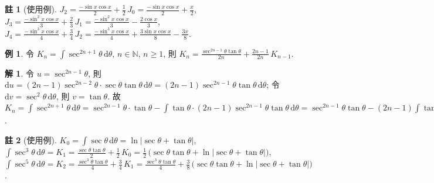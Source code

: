\documentclass[12pt]{extarticle}
\newcommand{\ds}{\displaystyle}
\newcommand{\ie}{\;\Longrightarrow\;}
\theoremstyle{definition}
\newtheorem*{ex}{例}
\newtheorem*{sol}{解}
\newtheorem*{rmk}{註}
\newcommand{\myline}{\noindent\makebox[\linewidth]{\rule{\paperwidth}{0.4pt}}}
\begin{document}
\begin{rmk}[使用例]
  $\ds J_2 = \frac{-\sin x\cos x}{2} + \frac{1}{2}\,J_0 = \frac{-\sin x\cos x}{2} + \frac{x}{2}$, $\ds J_3 = \frac{-\sin^2\!x\cos x}{3} + \frac{2}{3}\,J_1 = \frac{-\sin^2\!x\cos x}{3} - \frac{2\cos x}{3}$, $\ds J_4 = \frac{-\sin^3\!x\cos x}{4} + \frac{3}{4}\,J_2 = \frac{-\sin^3\!x\cos x}{4} + \frac{3\sin x\cos x}{8} - \frac{3x}{8}$.
\end{rmk}

\begin{ex} 
  令 $\ds K_n = \int\!\sec^{2n+1}\!\theta\,\text{d}\theta$, $n\in\mathbb{N}$, $n\geqslant 1$, 則 $\ds K_n = \frac{\sec^{2n - 1}\theta\tan\theta}{2n} + \frac{2n - 1}{2n}\,K_{n - 1}$. 
\end{ex}

\begin{sol}
  令 $\ds u = \sec^{2n - 1}\!\theta$, 則 $\ds\text{d}u = (2n - 1)\sec^{2n - 2}\theta\cdot\sec\theta\tan\theta\,\text{d}\theta = (2n - 1)\sec^{2n - 1}\theta\tan\theta\,\text{d}\theta$; 令 $\ds\text{d}v = \sec^2\theta\,\text{d}\theta$, 則 $\ds v = \tan\theta$. 故 $\ds K_n = \int\!\sec^{2n + 1}\!\theta\,\text{d}\theta = \sec^{2n - 1}\!\theta\cdot\tan\theta - \int\!\tan\theta\cdot(2n - 1)\sec^{2n - 1}\theta\tan\theta\,\text{d}\theta = \sec^{2n -1}\!\theta\tan\theta - (2n - 1)\int\!\tan^2\theta\cdot\sec^{2n - 1}\theta\,\text{d}\theta = \sec^{2n - 1}\!\theta\tan\theta - (2n - 1)\int\!(\sec^2\theta - 1)\cdot\sec^{2n - 1}\!\theta\,\text{d}\theta = \sec^{2n - 1}\!\theta\tan\theta - (2n - 1)\int\!\sec^{2n + 1}\theta\,\text{d}\theta + (2n - 1)\int\!\sec^{2 n - 1}\!\theta\,\text{d}\theta \ie K_n = \sec^{2n - 1}\!\theta\tan\theta - (2n - 1)K_n + (2n - 1)K_{n - 1} \ie K_n = \frac{\sec^{2n - 1}\!\theta\tan\theta}{2n} + \frac{2n - 1}{2n}K_{n - 1}$.
\end{sol}

\begin{rmk}[使用例]
  $\ds K_0 = \int\!\sec\theta\,\text{d}\theta = \ln|\sec\theta + \tan\theta|$, $\ds\int\!\sec^3\!\theta\,\text{d}\theta = K_1 = \frac{\sec\theta\tan\theta}{2} + \frac{1}{2}\,K_0 = \frac{1}{2}\,\big(\sec\theta\tan\theta + \ln|\sec\theta + \tan\theta|\big)$, $\ds \int\!\sec^5\!\theta\,\text{d}\theta = K_2 = \frac{\sec^3\!\theta\tan\theta}{4} + \frac{3}{4}\,K_1 = \frac{\sec^3\!\theta\tan\theta}{4} + \frac{3}{8}\,\big(\sec\theta\tan\theta + \ln|\sec\theta + \tan\theta|\big)$. 
\end{rmk}

\myline
\end{document}
